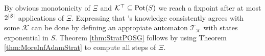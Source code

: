 By obvious monotonicity of $\Xi$ and $\mathcal{K}^{\top}\subseteq\operatorname{Pot}(S)$ we
reach a fixpoint after at most $2^{\left\vert{S}\right\vert}$ applications of $\Xi$. Expressing
that \eve{}'s knowledge consistently agrees with some $\mathcal{K}$ can be done
by defining an appropiate automaton $\mathcal{T}_{\mathcal{K}}$ with states
exponential in $S$. Theorem \ref{thm:StratPOSG} follows by using Theorem 
\ref{thm:MoreInfAdamStrat} to compute all steps of $\Xi$.
